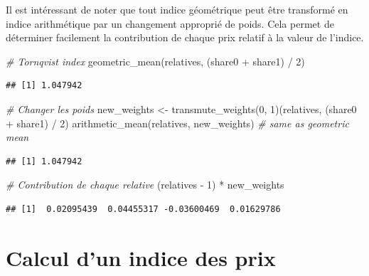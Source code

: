 \documentclass[
]{article}
\newenvironment{Shaded}{\begin{snugshade}}{\end{snugshade}}
\newcommand{\CommentTok}[1]{\textcolor[rgb]{0.56,0.35,0.01}{\textit{#1}}}
\newcommand{\DecValTok}[1]{\textcolor[rgb]{0.00,0.00,0.81}{#1}}
\newcommand{\FunctionTok}[1]{\textcolor[rgb]{0.00,0.00,0.00}{#1}}
\newcommand{\NormalTok}[1]{#1}
\newcommand{\OtherTok}[1]{\textcolor[rgb]{0.56,0.35,0.01}{#1}}
\newcommand{\SpecialCharTok}[1]{\textcolor[rgb]{0.00,0.00,0.00}{#1}}
\begin{document}
Il est intéressant de noter que tout indice géométrique peut être transformé en indice arithmétique par un changement approprié de poids. Cela permet de déterminer facilement la contribution de chaque prix relatif à la valeur de l'indice.

\begin{Shaded}
\begin{Highlighting}[]
\CommentTok{\# Tornqvist index}
\FunctionTok{geometric\_mean}\NormalTok{(relatives, (share0 }\SpecialCharTok{+}\NormalTok{ share1) }\SpecialCharTok{/} \DecValTok{2}\NormalTok{) }
\end{Highlighting}
\end{Shaded}

\begin{verbatim}
## [1] 1.047942
\end{verbatim}

\begin{Shaded}
\begin{Highlighting}[]
\CommentTok{\# Changer les poids}
\NormalTok{new\_weights }\OtherTok{\textless{}{-}} \FunctionTok{transmute\_weights}\NormalTok{(}\DecValTok{0}\NormalTok{, }\DecValTok{1}\NormalTok{)(relatives, (share0 }\SpecialCharTok{+}\NormalTok{ share1) }\SpecialCharTok{/} \DecValTok{2}\NormalTok{)}
\FunctionTok{arithmetic\_mean}\NormalTok{(relatives, new\_weights) }\CommentTok{\# same as geometric mean}
\end{Highlighting}
\end{Shaded}

\begin{verbatim}
## [1] 1.047942
\end{verbatim}

\begin{Shaded}
\begin{Highlighting}[]
\CommentTok{\# Contribution de chaque relative}
\NormalTok{(relatives }\SpecialCharTok{{-}} \DecValTok{1}\NormalTok{) }\SpecialCharTok{*}\NormalTok{ new\_weights}
\end{Highlighting}
\end{Shaded}

\begin{verbatim}
## [1]  0.02095439  0.04455317 -0.03600469  0.01629786
\end{verbatim}

\hypertarget{calcul-dun-indice-des-prix}{%
\section{Calcul d'un indice des prix}\label{calcul-dun-indice-des-prix}}
\end{document}
